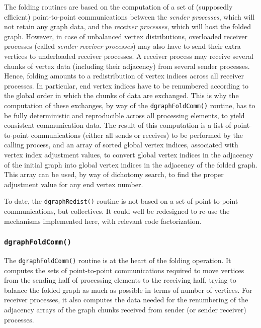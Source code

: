 The folding routines are based on the computation of a set of
(supposedly efficient) point-to-point communications between the
\textit{sender processes}, which will not retain any graph data, and
the \textit{receiver processes}, which will host the folded
graph. However, in case of unbalanced vertex distributions, overloaded
receiver processes (called \textit{sender receiver processes}) may
also have to send their extra vertices to underloaded receiver
processes. A receiver process may receive several chunks of vertex
data (including their adjacency) from several sender processes. Hence,
folding amounts to a redistribution of vertex indices across all
receiver processes. In particular, end vertex indices have to be
renumbered according to the global order in which the chunks of data
are exchanged. This is why the computation of these exchanges, by way
of the \texttt{dgraph\lbt Fold\lbt Comm()} routine, has to be fully
deterministic and reproducible across all processing elements, to
yield consistent communication data. The result of this computation
is a list of point-to-point communications (either all sends or
receives) to be performed by the calling process, and an array of
sorted global vertex indices, associated with vertex index adjustment
values, to convert global vertex indices in the adjacency of the
initial graph into global vertex indices in the adjacency of the
folded graph. This array can be used, by way of dichotomy search, to
find the proper adjustment value for any end vertex number.

To date, the \texttt{dgraph\lbt Redist()} routine is not based on a
set of point-to-point communications, but collectives. It could well
be redesigned to re-use the mechanisms implemented here, with relevant
code factorization.

\subsubsection{\texttt{dgraphFoldComm()}}

The \texttt{dgraphFoldComm()} routine is at the heart of the folding
operation. It computes the sets of point-to-point communications
required to move vertices from the sending half of processing elements
to the receiving half, trying to balance the folded graph as much as
possible in terms of number of vertices. For receiver processes, it
also computes the data needed for the renumbering of the adjacency
arrays of the graph chunks received from sender (or sender receiver)
processes.

